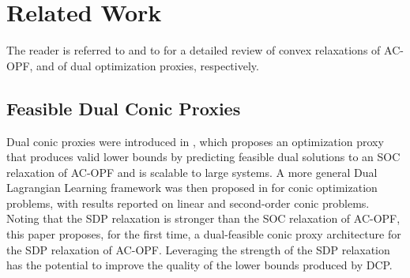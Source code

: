 \section{Related Work}
\label{sec:literature}

The reader is referred to \cite{Molzahn2019_OPF_survey} and to \cite{qiu2024dual,tanneau2024dual} for a detailed review of convex relaxations of AC-OPF, and of dual optimization proxies, respectively.


\subsection{Feasible Dual Conic Proxies}

Dual conic proxies were introduced in \cite{qiu2024dual}, which proposes an optimization proxy that produces valid lower bounds by predicting feasible dual solutions to an SOC relaxation of AC-OPF and is scalable to large systems.
A more general Dual Lagrangian Learning framework was then proposed in   \cite{tanneau2024dual} for conic optimization problems, with results reported on linear and second-order conic problems.
Noting that the SDP relaxation is stronger than the SOC relaxation of AC-OPF, this paper proposes, for the first time, a dual-feasible conic proxy architecture for the SDP relaxation of AC-OPF.
Leveraging the strength of the SDP relaxation has the potential to improve the quality of the lower bounds produced by DCP.
